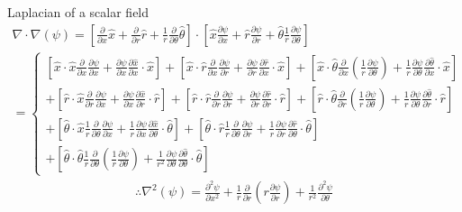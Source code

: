 \documentclass{kthreport}
\begin{document}
Laplacian of a scalar field
\begin{eqnarray}
\nabla\cdot\nabla(\psi) = \left[\frac{\partial}{\partial x}\hat{x} + \frac{\partial}{\partial r}\hat{r} + \frac{1}{r}\frac{\partial}{\partial \theta}\hat{\theta} \right]\cdot\left[\hat{x}\frac{\partial\psi}{\partial x} + \hat{r}\frac{\partial\psi}{\partial r} + \hat{\theta}\frac{1}{r}\frac{\partial\psi}{\partial \theta}\right] \nonumber \\
= \left\{
\begin{split}
	 \left[\hat{x}\cdot\hat{x}\frac{\partial }{\partial x}\frac{\partial \psi}{\partial x} + \frac{\partial \psi}{\partial x}\frac{\partial \hat{x}}{\partial x}\cdot\hat{x} \right] 
	 + \left[\hat{x}\cdot\hat{r} \frac{\partial }{\partial x}\frac{\partial \psi}{\partial r} + \frac{\partial \psi}{\partial r}\frac{\partial \hat{r}}{\partial x}\cdot\hat{x}		\right] 
	 + \left[\hat{x}\cdot\hat{\theta} \frac{\partial }{\partial x}\left(\frac{1}{r}\frac{\partial \psi}{\partial \theta}\right) + \frac{1}{r}\frac{\partial \psi}{\partial \theta}\frac{\partial \hat{\theta}}{\partial x}\cdot\hat{x}		\right] \\
	 + \left[\hat{r}\cdot\hat{x}\frac{\partial }{\partial r}\frac{\partial \psi}{\partial x} +   \frac{\partial \psi}{\partial x}\frac{\partial \hat{x}}{\partial r}\cdot\hat{r} \right] 
	 +  \left[\hat{r}\cdot\hat{r} \frac{\partial }{\partial r}\frac{\partial \psi}{\partial r} + \frac{\partial \psi}{\partial r}\frac{\partial \hat{r}}{\partial r}\cdot\hat{r}		\right] 
	 + \left[\hat{r}\cdot\hat{\theta} \frac{\partial }{\partial r}\left(\frac{1}{r}\frac{\partial \psi}{\partial \theta}\right) + \frac{1}{r}\frac{\partial \psi}{\partial \theta}\frac{\partial \hat{\theta}}{\partial r}\cdot\hat{r}		\right] \\
	 + \left[\hat{\theta}\cdot\hat{x}\frac{1}{r}\frac{\partial }{\partial \theta}\frac{\partial \psi}{\partial x} + \frac{1}{r}\frac{\partial \psi}{\partial x}\frac{\partial \hat{x}}{\partial \theta}\cdot\hat{\theta} \right]
	 +  \left[\hat{\theta}\cdot\hat{r}\frac{1}{r}\frac{\partial }{\partial \theta}\frac{\partial \psi}{\partial r} + \frac{1}{r}\frac{\partial \psi}{\partial r}\frac{\partial \hat{r}}{\partial \theta}\cdot\hat{\theta}		\right] \\
	 + \left[\hat{\theta}\cdot\hat{\theta} \frac{1}{r}\frac{\partial }{\partial \theta}\left(\frac{1}{r}\frac{\partial \psi}{\partial \theta}\right) + \frac{1}{r^2}\frac{\partial \psi}{\partial \theta}\frac{\partial \hat{\theta}}{\partial \theta}\cdot\hat{\theta}		\right]
\end{split}\right. \nonumber
\end{eqnarray}
%
\begin{eqnarray}
\therefore \nabla^{2}(\psi) = \frac{\partial^{2}\psi}{\partial x^{2}} +\frac{1}{r}\frac{\partial }{\partial r}\left(r\frac{\partial \psi}{\partial r}	\right) + \frac{1}{r^{2}}\frac{\partial^{2}\psi}{\partial \theta}
	\label{eqn:scalar_laplacian}
\end{eqnarray}
\end{document}
